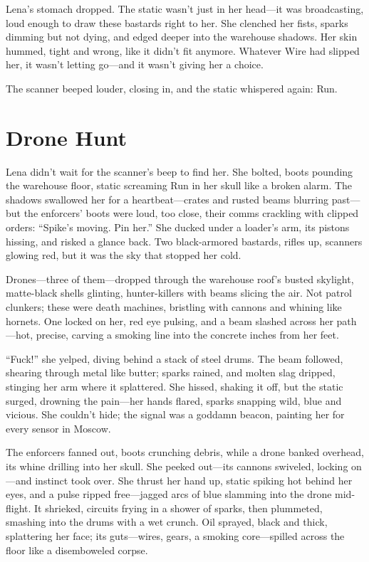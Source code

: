\documentclass[12pt]{book}
\begin{document}
Lena’s stomach dropped. The static wasn’t just in her head---it was broadcasting, loud enough to draw these bastards right to her. She clenched her fists, sparks dimming but not dying, and edged deeper into the warehouse shadows. Her skin hummed, tight and wrong, like it didn’t fit anymore. Whatever Wire had slipped her, it wasn’t letting go---and it wasn’t giving her a choice.

The scanner beeped louder, closing in, and the static whispered again: Run.

\section{Drone Hunt}

Lena didn’t wait for the scanner’s beep to find her. She bolted, boots pounding the warehouse floor, static screaming Run in her skull like a broken alarm. The shadows swallowed her for a heartbeat—crates and rusted beams blurring past—but the enforcers’ boots were loud, too close, their comms crackling with clipped orders: “Spike’s moving. Pin her.” She ducked under a loader’s arm, its pistons hissing, and risked a glance back. Two black-armored bastards, rifles up, scanners glowing red, but it was the sky that stopped her cold.

Drones—three of them—dropped through the warehouse roof’s busted skylight, matte-black shells glinting, hunter-killers with beams slicing the air. Not patrol clunkers; these were death machines, bristling with cannons and whining like hornets. One locked on her, red eye pulsing, and a beam slashed across her path—hot, precise, carving a smoking line into the concrete inches from her feet.

“Fuck!” she yelped, diving behind a stack of steel drums. The beam followed, shearing through metal like butter; sparks rained, and molten slag dripped, stinging her arm where it splattered. She hissed, shaking it off, but the static surged, drowning the pain—her hands flared, sparks snapping wild, blue and vicious. She couldn’t hide; the signal was a goddamn beacon, painting her for every sensor in Moscow.

The enforcers fanned out, boots crunching debris, while a drone banked overhead, its whine drilling into her skull. She peeked out—its cannons swiveled, locking on—and instinct took over. She thrust her hand up, static spiking hot behind her eyes, and a pulse ripped free—jagged arcs of blue slamming into the drone mid-flight. It shrieked, circuits frying in a shower of sparks, then plummeted, smashing into the drums with a wet crunch. Oil sprayed, black and thick, splattering her face; its guts—wires, gears, a smoking core—spilled across the floor like a disemboweled corpse.
\end{document}
